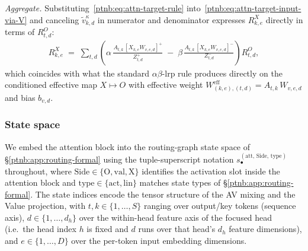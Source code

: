\emph{Aggregate.} Substituting~\eqref{ptnb:eq:attn-target-rule} into~\eqref{ptnb:eq:attn-target-input-via-V}
and canceling $\tilde v_{k,d}^\kappa$ in numerator and denominator expresses $R^X_{k,e}$ directly
in terms of $R^O_{t,d}$:
\begin{align}\label{ptnb:eq:attn-target-input}
    R^X_{k,e}
    \;=\; \sum_{t,d} \left(
    \alpha\, \frac{A_{t,k}\, [X_{k,e} W_{v,e,d}]^+}{Z_{t,d}^+}
    \;-\;
    \beta\, \frac{A_{t,k}\, [X_{k,e} W_{v,e,d}]^-}{Z_{t,d}^-}
    \right) R^O_{t,d},
\end{align}
which coincides with what the standard $\alpha\beta$-\ac{lrp} rule produces directly on the
conditioned effective map $X \mapsto O$ with effective weight $W^{\mathrm{eff}}_{(k,e),(t,d)} =
    A_{t,k}\,W_{v,e,d}$ and bias $b_{v,d}$.

\subsubsection{State space}\label{ptnb:app:attention-state-space}

We embed the attention block into the routing-graph state space of \S\ref{ptnb:app:routing-formal} using
the tuple-superscript notation $s_\bullet^{(\mathrm{att},\,\mathrm{Side},\,\mathrm{type})}$
throughout, where $\mathrm{Side} \in \{\mathrm{O}, \mathrm{val}, \mathrm{X}\}$ identifies the
activation slot inside the attention block and $\mathrm{type} \in \{\mathrm{act}, \mathrm{lin}\}$
matches state types of \S\ref{ptnb:app:routing-formal}. The state indices encode the tensor structure of
the AV mixing and the Value projection, with $t,k \in \{1,\dots,S\}$ ranging over output/key tokens
(sequence axis), $d \in \{1,\dots,d_h\}$ over the within-head feature axis of the focused head
(i.e.\ the head index $h$ is fixed and $d$ runs over that head's $d_h$ feature dimensions), and $e
    \in \{1,\dots,D\}$ over the per-token input embedding dimensions.

